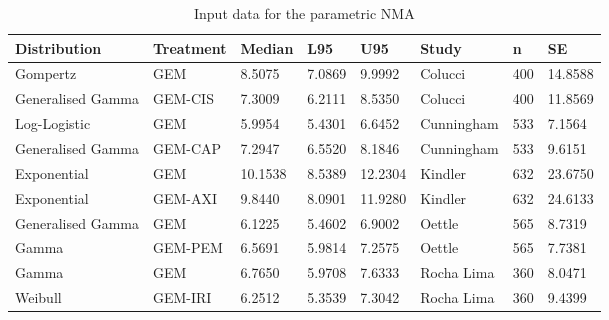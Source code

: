 \begin{table}[h]
    \center
    \begin{tabular}{llllllll}
    \hline
    Distribution      & Treatment & Median  & L95    & U95     & Study      & n   & SE      \\ \hline
    Gompertz          & GEM       & 8.5075  & 7.0869 & 9.9992  & Colucci    & 400 & 14.8588 \\
    Generalised Gamma & GEM-CIS   & 7.3009  & 6.2111 & 8.5350  & Colucci    & 400 & 11.8569 \\
    Log-Logistic      & GEM       & 5.9954  & 5.4301 & 6.6452  & Cunningham & 533 & 7.1564  \\
    Generalised Gamma & GEM-CAP   & 7.2947  & 6.5520 & 8.1846  & Cunningham & 533 & 9.6151  \\
    Exponential       & GEM       & 10.1538 & 8.5389 & 12.2304 & Kindler    & 632 & 23.6750 \\
    Exponential       & GEM-AXI   & 9.8440  & 8.0901 & 11.9280 & Kindler    & 632 & 24.6133 \\
    Generalised Gamma & GEM       & 6.1225  & 5.4602 & 6.9002  & Oettle     & 565 & 8.7319  \\
    Gamma             & GEM-PEM   & 6.5691  & 5.9814 & 7.2575  & Oettle     & 565 & 7.7381  \\
    Gamma             & GEM       & 6.7650  & 5.9708 & 7.6333  & Rocha Lima & 360 & 8.0471  \\
    Weibull           & GEM-IRI   & 6.2512  & 5.3539 & 7.3042  & Rocha Lima & 360 & 9.4399  \\ \hline
    \end{tabular}
    \caption{Input data for the parametric NMA}
    \label{paramNMAInputs}
\end{table}
